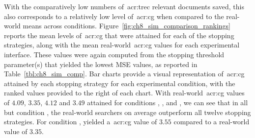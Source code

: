 With the comparatively low numbers of~\gls{acr:trec} relevant documents saved, this also corresponds to a relatively low level of~\gls{acr:cg} when compared to the real-world means across conditions. Figure~\ref{fig:ch8_sim_comparison_rankings} reports the mean levels of~\gls{acr:cg} that were attained for each of the stopping strategies, along with the mean real-world~\gls{acr:cg} values for each experimental interface. These values were again computed from the stopping threshold parameter(s) that yielded the lowest MSE values, as reported in Table~\ref{tbl:ch8_sim_comp}. Bar charts provide a visual representation of~\gls{acr:cg} attained by each stopping strategy for each experimental condition, with the ranked values provided to the right of each chart. With real-world~\gls{acr:cg} values of $4.09$, $3.35$, $4.12$ and $3.49$ attained for conditions , ,  and , we can see that in all but condition , the real-world searchers on average outperform all twelve stopping strategies. For condition ,  yielded a~\gls{acr:cg} value of $3.55$ compared to a real-world value of $3.35$.

